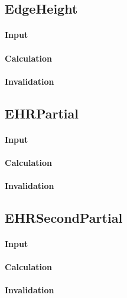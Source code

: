 \subsection{EdgeHeight}

\paragraph{Input}

\paragraph{Calculation}

\paragraph{Invalidation}

\bigskip

\subsection{EHRPartial}

\paragraph{Input}

\paragraph{Calculation}

\paragraph{Invalidation}

\bigskip

\subsection{EHRSecondPartial}

\paragraph{Input}

\paragraph{Calculation}

\paragraph{Invalidation}


